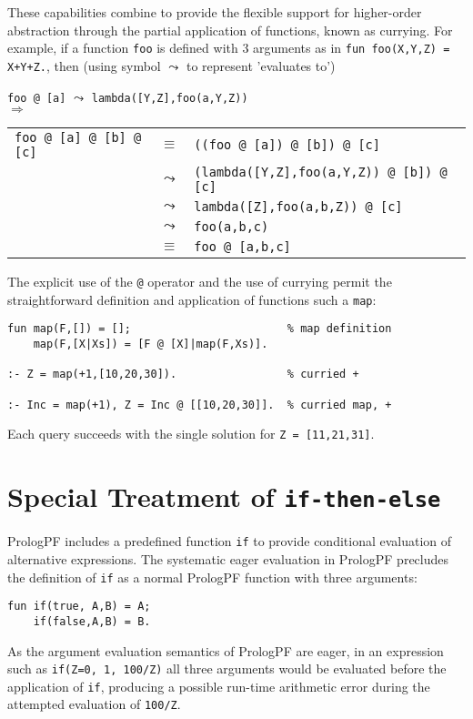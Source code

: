 These capabilities combine to provide the flexible support for
higher-order abstraction through the partial application of functions, known as currying.
For example, if a function \texttt{foo} is defined
with 3 arguments as in \texttt{fun foo(X,Y,Z) = X+Y+Z.}, then
(using symbol $\leadsto$ to represent 'evaluates to')

\texttt{foo @ [a]} $\leadsto$ \texttt{lambda([Y,Z],foo(a,Y,Z))}\\
$\Longrightarrow$\\
\begin{tabular}{l l l}
\texttt{foo @ [a] @ [b] @ [c]}
 & $\equiv$   & \texttt{((foo @ [a]) @ [b]) @ [c]}\\
 & $\leadsto$ & \texttt{(lambda([Y,Z],foo(a,Y,Z)) @ [b]) @ [c]}\\
 & $\leadsto$ & \texttt{lambda([Z],foo(a,b,Z)) @ [c]}\\
 & $\leadsto$ & \texttt{foo(a,b,c)}\\
 & $\equiv$   & \texttt{foo @ [a,b,c]}\\
\end{tabular}

The explicit use of the \texttt{@} operator and the use of currying permit the
straightforward definition and application of functions such a \texttt{map}:
\begin{verbatim}
fun map(F,[]) = [];                        % map definition
    map(F,[X|Xs]) = [F @ [X]|map(F,Xs)].

:- Z = map(+1,[10,20,30]).                 % curried +

:- Inc = map(+1), Z = Inc @ [[10,20,30]].  % curried map, +
\end{verbatim}
Each query succeeds with the single solution for \texttt{Z = [11,21,31]}.

\section{Special Treatment of \texttt{if-then-else}} %
\label{if-then-else}

PrologPF includes a predefined function \texttt{if} to provide conditional
evaluation of alternative expressions.  The systematic eager evaluation in
PrologPF precludes the definition of \texttt{if} as a normal PrologPF function
with three arguments:
\begin{verbatim}
fun if(true, A,B) = A;
    if(false,A,B) = B.
\end{verbatim}
As the argument evaluation semantics of PrologPF are eager,
in an expression such as \texttt{if(Z=0, 1, 100/Z)} all three arguments
would be evaluated before the application of \texttt{if}, producing a
possible
run-time arithmetic error during the attempted evaluation of \texttt{100/Z}.

